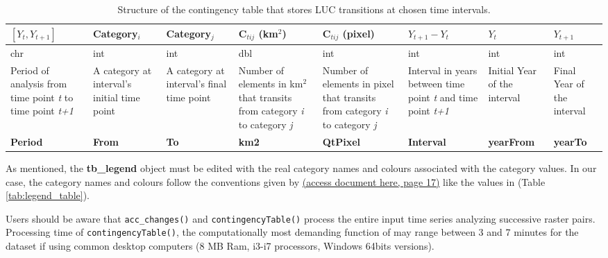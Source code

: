 \begin{table}[htbp]
\centering
\caption{Structure of the contingency table that stores LUC transitions at chosen time intervals.}
\label{tab:prototype}
\begin{tabular}[t]{>{\centering}p{}<{\small}>{\centering}p{}<{\small}>{\centering}p{}<{\small}>{\small}p{}<{\centering}>{\small}p{}<{\centering}>{\small}p{}<{\centering}>{\small}p{}<{\centering}>{\small}p{}<{\centering}}
\toprule
\([Y_t,Y_{t+1}]\) & Category\(_i\) & Category\(_j\) & C\(_{tij}\) (km\(^2\)) & C\(_{tij}\) (pixel) & \(Y_{t+1} - Y_t\) & \(Y_t\) & \(Y_{t+1}\) \\
\midrule
chr & int & int & dbl & int & int & int & int \\

Period of analysis from time point \textit{t} to time point \textit{t+1} & A category at interval's initial time point & A category at  interval's final time point & Number of elements in km\(^2\) that transits from category \textit{i} to category \textit{j} & Number of elements in pixel that transits from category \textit{i} to category \textit{j} & Interval in years between time point \textit{t} and time point \textit{t+1} & Initial Year of the interval & Final Year of the interval \\
\textbf{Period} & \textbf{From} & \textbf{To} & \textbf{km2} & \textbf{QtPixel} & \textbf{Interval} & \textbf{yearFrom} & \textbf{yearTo} \\
\bottomrule
\end{tabular}
\end{table}

As mentioned, the \textbf{tb\_legend} object must be edited with the
real category names and colours associated with the category values. In
our case, the category names and colours follow the conventions given by
\citep{sospantanal2015}
\href{https://www.embrapa.br/documents/1354999/1529097/BAP+-+Mapeamento+da+Bacia+do+Alto+Paraguai+-+estudo+completo/e66e3afb-2334-4511-96a0-af5642a56283}{(access
document here, page 17)} like the values in (Table
\ref{tab:legend_table}).

Users should be aware that \texttt{acc\_changes()} and \texttt{contingencyTable()} process the entire input time series analyzing successive raster pairs. Processing time of \texttt{contingencyTable()}, the computationally most demanding function of  may range between 3 and 7 minutes for the  dataset if using common desktop computers (8 MB Ram, i3-i7 processors, Windows 64bits versions).

